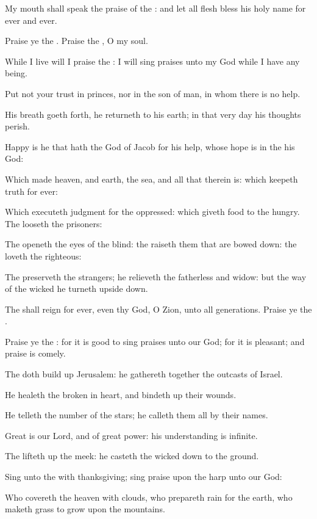 \Verse My mouth shall speak the praise of the \LORD: and let all flesh bless his holy name for ever and ever.




\Chapter
\Verse Praise ye the \LORD. Praise the \LORD, O my soul.

\Verse While I live will I praise the \LORD: I will sing praises unto my God while I have any being.

\Verse Put not your trust in princes, nor in the son of man, in whom there is no help.

\Verse His breath goeth forth, he returneth to his earth; in that very day his thoughts perish.

\Verse Happy is he that hath the God of Jacob for his help, whose hope is in the \LORD his God:

\Verse Which made heaven, and earth, the sea, and all that therein is: which keepeth truth for ever:

\Verse Which executeth judgment for the oppressed: which giveth food to the hungry. The \LORD looseth the prisoners:

\Verse The \LORD openeth the eyes of the blind: the \LORD raiseth them that are bowed down: the \LORD loveth the righteous:

\Verse The \LORD preserveth the strangers; he relieveth the fatherless and widow: but the way of the wicked he turneth upside down.

\Verse The \LORD shall reign for ever, even thy God, O Zion, unto all generations. Praise ye the \LORD.




\Chapter
\Verse Praise ye the \LORD: for it is good to sing praises unto our God; for it is pleasant; and praise is comely.

\Verse The \LORD doth build up Jerusalem: he gathereth together the outcasts of Israel.

\Verse He healeth the broken in heart, and bindeth up their wounds.

\Verse He telleth the number of the stars; he calleth them all by their names.

\Verse Great is our Lord, and of great power: his understanding is infinite.

\Verse The \LORD lifteth up the meek: he casteth the wicked down to the ground.

\Verse Sing unto the \LORD with thanksgiving; sing praise upon the harp unto our God:

\Verse Who covereth the heaven with clouds, who prepareth rain for the earth, who maketh grass to grow upon the mountains.

